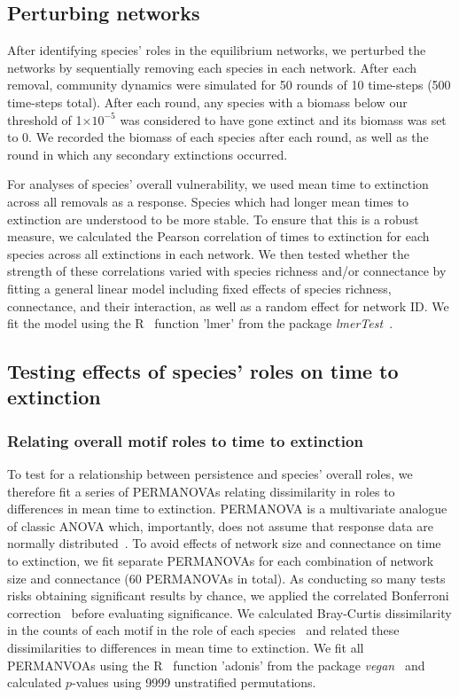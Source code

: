 \documentclass[12pt]{article}
\begin{document}
	\subsection*{Perturbing networks}

		After identifying species' roles in the equilibrium networks, we perturbed the networks by sequentially removing each species in each network. After each removal, community dynamics were simulated for 50 rounds of 10 time-steps (500 time-steps total). After each round, any species with a biomass below our threshold of 1$\times10^{-5}$ was considered to have gone extinct and its biomass was set to 0. We recorded the biomass of each species after each round, as well as the round in which any secondary extinctions occurred.


		For analyses of species' overall vulnerability, we used mean time to extinction across all removals as a response. Species which had longer mean times to extinction are understood to be more stable. To ensure that this is a robust measure, we calculated the Pearson correlation of times to extinction for each species across all extinctions in each network. We then tested whether the strength of these correlations varied with species richness and/or connectance by fitting a general linear model including fixed effects of species richness, connectance, and their interaction, as well as a random effect for network ID. We fit the model using the R~\citep{R} function 'lmer' from the package \emph{lmerTest}~\citep{lmerTest}.


	\subsection*{Testing effects of species' roles on time to extinction}

		\subsubsection*{Relating overall motif roles to time to extinction}

			To test for a relationship between persistence and species' overall roles, we therefore fit a series of PERMANOVAs relating dissimilarity in roles to differences in mean time to extinction.
			PERMANOVA is a multivariate analogue of classic ANOVA which, importantly, does not assume that response data are normally distributed~\citep{Anderson2001}.
			To avoid effects of network size and connectance on time to extinction, we fit separate PERMANOVAs for each combination of network size and connectance (60 PERMANOVAs in total).
			As conducting so many tests risks obtaining significant results by chance, we applied the correlated Bonferroni correction~\citep{Drezner2016} before evaluating significance.
			We calculated Bray-Curtis dissimilarity in the counts of each motif in the role of each species~\citep{Baker2015,Cirtwill2015} and related these dissimilarities to differences in mean time to extinction.
			We fit all PERMANVOAs using the R~\citep{R} function 'adonis' from the package \emph{vegan}~\citep{vegan} and calculated $p$-values using 9999 unstratified permutations.
\end{document}
